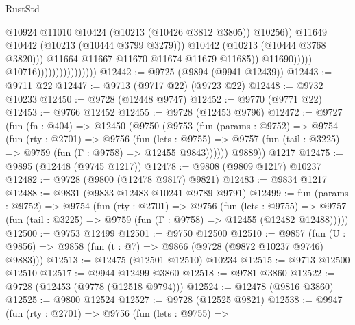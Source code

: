 \begin{lexlean}{RustStd}
\begin{coremodule}
                                                          @10924
                                                          @11010
                                                          @10424
                                                          (@10213 (@10426 @3812 @3805))
                                                          @10256))
                                                      @11649
                                                      @10442
                                                      (@10213 (@10444 @3799 @3279)))
                                                    @10442
                                                    (@10213 (@10444 @3768 @3820)))
                                                  @11664
                                                  @11667
                                                  @11670
                                                  @11674
                                                  @11679
                                                  @11685))
                                              @11690)))))
                                    @10716))))))))))))))))
@12442 := @9725 (@9894 (@9941 @12439))
@12443 := @9711 @22
@12447 := @9713 (@9717 @22) (@9723 @22)
@12448 := @9732 @10233
@12450 := @9728 (@12448 @9747)
@12452 := @9770 (@9771 @22)
@12453 := @9766 @12452
@12455 := @9728 (@12453 @9796)
@12472 := @9727
    (fun (fn : @404) =>
    @12450
      (@9750
        (@9753
          (fun (params : @9752) =>
          @9754
            (fun (rty : @2701) =>
            @9756
              (fun (lets : @9755) =>
              @9757 (fun (tail : @3225) => @9759 (fun (Γ : @9758) => @12455 @9843))))))
        @9889))
    @1217
@12475 := @9895 (@12448 (@9745 @1217))
@12478 := @9808 (@9809 @1217) @10237
@12482 := @9728 (@9800 (@12478 @9817) @9821)
@12483 := @9834 @1217
@12488 := @9831 (@9833 @12483 @10241 @9789 @9791)
@12499 := fun (params : @9752) =>
  @9754
    (fun (rty : @2701) =>
    @9756
      (fun (lets : @9755) =>
      @9757 (fun (tail : @3225) => @9759 (fun (Γ : @9758) => @12455 (@12482 @12488)))))
@12500 := @9753 @12499
@12501 := @9750 @12500
@12510 := @9857
    (fun (U : @9856) => @9858 (fun (t : @7) => @9866 (@9728 (@9872 @10237 @9746) @9883)))
@12513 := @12475 (@12501 @12510) @10234
@12515 := @9713 @12500 @12510
@12517 := @9944 @12499 @3860
@12518 := @9781 @3860
@12522 := @9728 (@12453 (@9778 (@12518 @9794)))
@12524 := @12478 (@9816 @3860)
@12525 := @9800 @12524
@12527 := @9728 (@12525 @9821)
@12538 := @9947
    (fun (rty : @2701) =>
    @9756
      (fun (lets : @9755) =>

\end{coremodule}
\end{lexlean}
